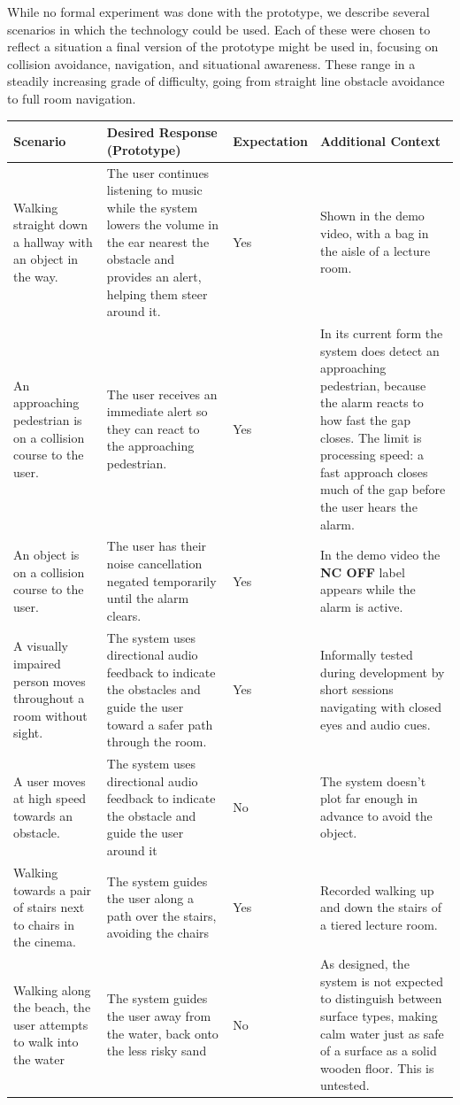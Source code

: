 \documentclass[a4paper]{article}
\begin{document}
While no formal experiment was done with the prototype, we describe several scenarios in which the technology could be used. Each of these were chosen to reflect a situation a final version of the prototype might be used in, focusing on collision avoidance, navigation, and situational awareness. These range in a steadily increasing grade of difficulty, going from straight line obstacle avoidance to full room navigation.

\begin{table}[H]
\centering
\begin{tabular}{|l|l|l|l|}
	\hline
	\textbf{Scenario} & \textbf{Desired Response (Prototype)} & \textbf{Expectation} & \textbf{Additional Context} \\
	\hline
	Walking straight down a hallway with an object in the way. & The user continues listening to music while the system lowers the volume in the ear nearest the obstacle and provides an alert, helping them steer around it. & Yes & Shown in the demo video, with a bag in the aisle of a lecture room. \\
	An approaching pedestrian is on a collision course to the user. & The user receives an immediate alert so they can react to the approaching pedestrian. & Yes & In its current form the system does detect an approaching pedestrian, because the alarm reacts to how fast the gap closes. The limit is processing speed: a fast approach closes much of the gap before the user hears the alarm. \\
	An object is on a collision course to the user. & The user has their noise cancellation negated temporarily until the alarm clears. & Yes & In the demo video the \textbf{NC OFF} label appears while the alarm is active. \\
	A visually impaired person moves throughout a room without sight. & The system uses directional audio feedback to indicate the obstacles and guide the user toward a safer path through the room. & Yes & Informally tested during development by short sessions navigating with closed eyes and audio cues. \\
	A user moves at high speed towards an obstacle. & The system uses directional audio feedback to indicate the obstacle and guide the user around it & No & The system doesn't plot far enough in advance to avoid the object. \\
	Walking towards a pair of stairs next to chairs in the cinema. & The system guides the user along a path over the stairs, avoiding the chairs & Yes & Recorded walking up and down the stairs of a tiered lecture room. \\
	Walking along the beach, the user attempts to walk into the water & The system guides the user away from the water, back onto the less risky sand & No & As designed, the system is not expected to distinguish between surface types, making calm water just as safe of a surface as a solid wooden floor. This is untested. \\
	\hline
\end{tabular}
\end{table}
\end{document}
